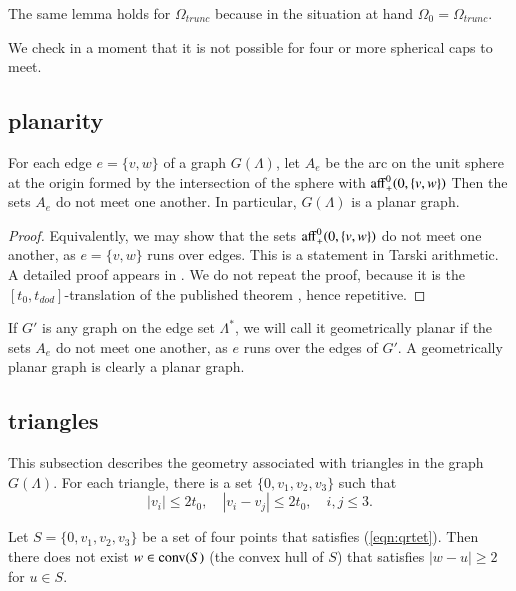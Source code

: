 The same lemma holds
for $\Omega_{trunc}$ because in the situation at hand $\Omega_0=\Omega_{trunc}$.

We check in a moment that it is not possible for four or more
spherical caps to meet.

\subsection{planarity}


\begin{lemma}  For each edge $e=\{v,w\}$ of a graph $G(\Lambda)$,
let $A_e$ be the arc on the unit sphere at the origin formed
by the intersection of the sphere with ${\operatorname{aff}}^0_+(0,\{v,w\})$
Then the sets $A_e$ do not meet one another.  In particular,
$G(\Lambda)$ is a planar graph.
\end{lemma}

\begin{proof}  Equivalently, we may show that the sets
${\operatorname{aff}}^0_+(0,\{v,w\})$ do not meet one another, as $e=\{v,w\}$
runs over edges.  This is a statement in Tarski arithmetic.
A detailed proof appears in \cite[Lemma~3.2]{arx}.  We do not
repeat the proof, because it is the $[t_0,t_{dod}]$-translation
of the published theorem \cite[Lemma~3.10]{Part1}, hence
repetitive.
\end{proof}

If $G'$ is any graph on the edge set $\Lambda^*$, we will call
it geometrically planar if the sets $A_e$ do not meet one
another, as $e$ runs over the edges of $G'$.  A geometrically
planar graph is clearly a planar graph.

\subsection{triangles}

This subsection describes the geometry associated with
triangles in the graph $G(\Lambda)$.  For each triangle,
there is a set $\{0,v_1,v_2,v_3\}$ such that
\begin{equation}\label{eqn:qrtet}
  |v_i| \le 2t_0,\quad |v_i-v_j | \le 2 t_0,\quad i,j\le 3.
\end{equation}

\begin{lemma} Let $S=\{0,v_1,v_2,v_3\}$ be a set of four points
that satisfies (\ref{eqn:qrtet}).  Then
there does not exist $w\in{\operatorname{conv}}(S)$
(the convex hull of $S$) that satisfies $|w-u|\ge 2$ for 
$u\in S$.
\end{lemma}

